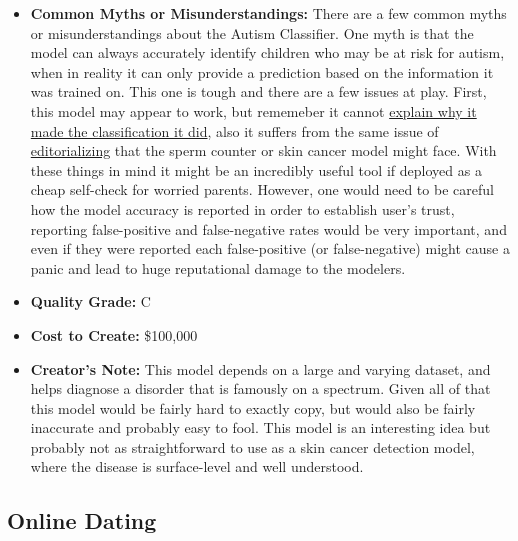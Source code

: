 \begin{itemize}
    \item \textbf{Common Myths or Misunderstandings:}  There are a few common myths or misunderstandings about the Autism Classifier. One myth is that the model can always accurately identify children who may be at risk for autism, when in reality it can only provide a prediction based on the information it was trained on. This one is tough and there are a few issues at play. First, this model may appear to work, but rememeber it cannot \hyperref[sec:explain]{explain why it made the classification it did}, also it suffers from the same issue of \hyperref[sec:janitor]{editorializing} that the sperm counter or skin cancer model might face. With these things in mind it might be an incredibly useful tool if deployed as a cheap self-check for worried parents. However, one would need to be careful how the model accuracy is reported in order to establish user's trust, reporting false-positive and false-negative rates would be very important, and even if they were reported each false-positive (or false-negative) might cause a panic and lead to huge reputational damage to the modelers.   
    \item \textbf{Quality Grade:} C
    \item \textbf{Cost to Create:} \$100,000
    \item \textbf{Creator's Note:} This model depends on a large and varying dataset, and helps diagnose a disorder that is famously on a spectrum. Given all of that this model would be fairly hard to exactly copy, but would also be fairly inaccurate and probably easy to fool. This model is an interesting idea but probably not as straightforward to use as a skin cancer detection model, where the disease is surface-level and well understood.
\end{itemize}

\subsection{Online Dating}

